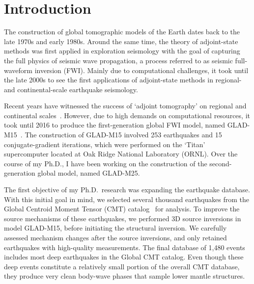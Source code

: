 \chapter{Introduction\label{ch:intro}}

The construction of global tomographic models of the Earth
dates back to the late 1970s and early 1980s.
Around the same time, the theory of adjoint-state methods was
first applied in exploration seismology with the goal of
capturing the full physics of seismic wave propagation,
a process referred to as seismic full-waveform inversion (FWI).
Mainly due to computational challenges, it took until the late
2000s to see the first applications of adjoint-state methods
in regional- and continental-scale earthquake seismology.

Recent years have witnessed the success of `adjoint tomography' on regional and continental scales~\cite{tape2009adjoint, zhu2012structure,chen2015multiparameter}.
However, due to high demands on computational resources,
it took until 2016 to produce the first-generation global FWI model, named
GLAD-M15~\cite{bozdaug2016global}.
The construction of GLAD-M15 involved 253 earthquakes and
15 conjugate-gradient iterations, which were performed
on the `Titan' supercomputer located at Oak Ridge National Laboratory (ORNL).
Over the course of my Ph.D.,
I have been working on the construction of the second-generation global model, named GLAD-M25.

The first objective of my Ph.D.\ research was expanding the earthquake database.
With this initial goal in mind,
we selected several thousand earthquakes from the Global Centroid Moment Tensor (CMT) catalog~\cite{ekstrom2012global} for analysis.
To improve the source mechanisms of these earthquakes,
we performed 3D source inversions in model GLAD-M15,
before initiating the structural inversion.
We carefully assessed mechanism changes
after the source inversions,
and only retained earthquakes with high-quality measurements.
The final database of 1,480 events includes most deep earthquakes in the Global CMT catalog.
Even though these deep events constitute a relatively small portion of
the overall CMT database, they produce very clean body-wave phases
that sample lower mantle structures.

